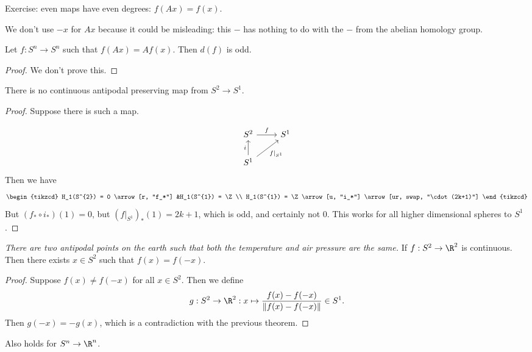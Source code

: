 \begin{remark}
    Exercise: even maps have even degrees: $f(A x) = f(x)$.
\end{remark}
\begin{remark}
    We don't use $- x$ for $Ax$ because it could be misleading: this $-$ has nothing to do with the $-$ from the abelian homology group.
\end{remark}

\begin{theorem}
    Let $f: S^{n} \to  S^{n}$ such that $f(Ax) = A f(x)$.
    Then  $d(f)$ is odd.
\end{theorem}
\begin{proof}
    We don't prove this.
\end{proof}

\begin{theorem}
    There is no continuous antipodal preserving map from $S^2 \to  S^{1}$.
\end{theorem}
\begin{proof}
    Suppose there is such a map.
    \begin{figure}[H]
        \centering
        \label{fig:no-antipodal-preserving-map-from-s2-to-s1}
    \end{figure}
\[
    \begin{tikzcd}
        S^2 \arrow[r, "f"] & S^{1}\\
        S^{1} \arrow[u, "i"] \arrow[ur, swap, "f|_{S^{1}}"] &
    \end{tikzcd}
\]
Then we have
\[
    \begin{tikzcd}
        H_1(S^{2}) = 0 \arrow[r, "f_*"] &H_1(S^{1}) = \Z\\
        H_1(S^{1}) = \Z \arrow[u, "i_*"] \arrow[ur, swap, "\cdot (2k+1)"]
    \end{tikzcd}
\]
But $(f_*  \circ  i_*)(1) = 0$, but $(f|_{S^{1}})_*(1) = 2k+1$, which is odd, and certainly not $0$.
This works for all higher dimensional spheres to $S^1$.
\end{proof}


\begin{theorem}
    \emph{There are two antipodal points on the earth such that both the temperature and air pressure are the same.}
    If $f: S^{2} \to  \R^2$ is continuous.
    Then there exists $x \in S^2$ such that $f(x) = f(-x)$.
\end{theorem}
\begin{proof}
    Suppose $f(x) \neq f(-x)$ for all  $x \in S^2$.
    Then  we define
    \[
        g: S^2 \to  \R^2: x \mapsto \frac{f(x) - f(-x)}{\|f(x) - f(-x)\|} \in S^1
    .\] 
    Then $g(-x) = -g(x)$, which is a contradiction with the previous theorem.
\end{proof}
\begin{remark}
    Also holds for $S^{n}\to \R^n$.
\end{remark}

